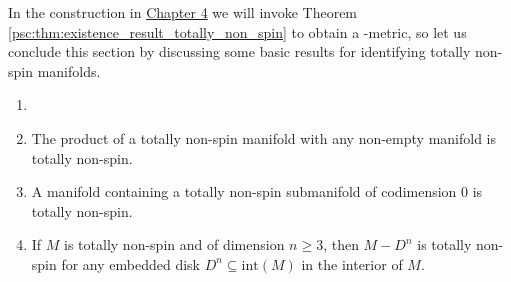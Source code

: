In the construction in \hyperref[chapter:main_construction]{Chapter 4} we will invoke Theorem \ref{psc:thm:existence_result_totally_non_spin} to obtain a \psc\nobreakdash-metric, so let us conclude this section by discussing some basic results for identifying totally non-spin manifolds.

\needspace{5cm}

\begin{lemma}
    \label{psc:lem:totally_non_spin_lemma} 
    \begin{enumerate}[label=(\roman*)]
        \item[]
        \item \vspace{-.5em} The product of a totally non-spin manifold with any non-empty manifold is totally non-spin. \label{eq:totally_non_spin_lemma1}
        \item A manifold containing a totally non-spin submanifold of codimension $0$ is totally non-spin. \label{eq:totally_non_spin_lemma2}
        \item If $M$ is totally non-spin and of dimension $n \geq 3$, then $M - D^n$ is totally non-spin for any embedded disk $D^n \subseteq \mathrm{int}(M)$ in the interior of $M$. \label{eq:totally_non_spin_lemma3}
    \end{enumerate}
\end{lemma}

